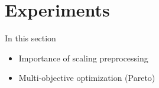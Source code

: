 \chapter{Experiments}
\label{Chapter5}

In this section 

\begin{itemize}
    \item Importance of scaling preprocessing
    \item Multi-objective optimization (Pareto)
\end{itemize}